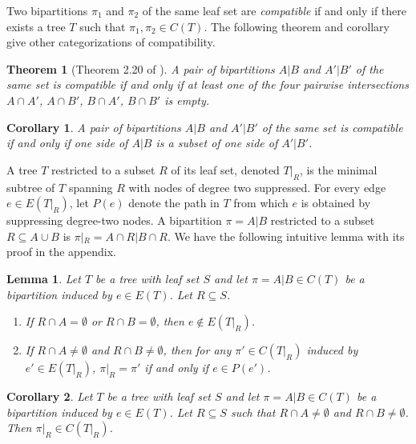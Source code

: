 \documentclass{bmcart}
\newtheorem{theorem}{Theorem}
\newtheorem{lemma}{Lemma}
\newtheorem{corollary}{Corollary}
\begin{document}
Two bipartitions $\pi_1$ and $\pi_2$ of the same leaf set are \textit{compatible} if and only if there exists a tree $T$ such that $\pi_1, \pi_2 \in C(T)$. The following theorem and corollary give other categorizations of compatibility.
\begin{theorem}[Theorem 2.20 of \cite{warnow2017computational}]\label{thm:compatibility}
    A pair of bipartitions $A|B$ and $A'|B'$ of the same set is compatible if and only if at least one of the four pairwise intersections $A \cap A'$, $A\cap B'$, $B\cap A'$, $B \cap B'$ is empty. 
\end{theorem}

\begin{corollary}\label{cor:compatibility}
     A pair of bipartitions $A|B$ and $A'|B'$ of the same set is compatible if and only if one side of $A|B$ is a subset of one side of $A'|B'$.
\end{corollary}
\medskip

A tree $T$ restricted to a subset $R$ of its leaf set, denoted $T|_R$, is the minimal subtree of $T$ spanning $R$ with nodes of degree two suppressed. For every edge $e \in E(T|_R)$, let $P(e)$ denote the path in $T$ from which $e$ is obtained by suppressing degree-two nodes. A bipartition $\pi = A|B$ restricted to a subset $R \subseteq A\cup B$ is $\pi|_R = A\cap R | B\cap R$. We have the following intuitive lemma with its proof in the appendix.

\begin{lemma} \label{lem:bipar_restrict_edge}
    Let $T$ be a tree with leaf set $S$ and let $\pi = A|B \in C(T)$ be a bipartition induced by $e \in E(T)$. Let $R \subseteq S$.
    \begin{enumerate}
        \item If $R \cap A = \emptyset$ or $R \cap B = \emptyset$, then $e \notin E(T|_R)$.
        \item If $R \cap A \neq \emptyset$ and $R \cap B \neq \emptyset$, then for any $\pi' \in C(T|_R)$ induced by $e' \in E(T|_R)$, $\pi|_R = \pi'$ if and only if $e \in P(e')$.
    \end{enumerate}
\end{lemma}

\begin{corollary} \label{cor:bipar_restrict}
    Let $T$ be a tree with leaf set $S$ and let $\pi = A|B \in C(T)$ be a bipartition induced by $e \in E(T)$. Let $R \subseteq S$ such that $R \cap A \neq \emptyset$ and $R \cap B \neq \emptyset$. Then $\pi|_R \in C(T|_R)$. 
\end{corollary}
\end{document}
